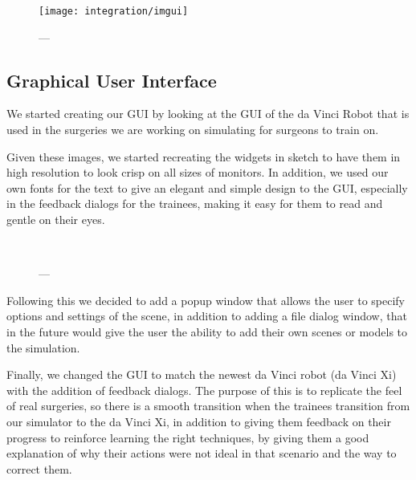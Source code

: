 \begin{figure}
  \centering%
  \texttt{[image: integration/imgui]}
  \caption{---}\label{fig:}
\end{figure}

\subsection{Graphical User Interface}\label{ssec:gui}
We started creating our GUI by looking at the GUI of the da Vinci Robot that is used in the surgeries we are working on simulating for surgeons to train on.

Given these images, we started recreating the widgets in sketch to have them in high resolution to look crisp on all sizes of monitors. In addition, we used our own fonts for the text to give an elegant and simple design to the GUI, especially in the feedback dialogs for the trainees, making it easy for them to read and gentle on their eyes.

\begin{figure}
  \centering%
  \setlength{\fboxsep}{0pt}%
  \setlength{\fboxrule}{0.1pt}%
  \\[1ex]
  \caption{---}\label{fig:}
\end{figure}

Following this we decided to add a popup window that allows the user to specify options and settings of the scene, in addition to adding a file dialog window, that in the future would give the user the ability to add their own scenes or models to the simulation.

\begin{figure}
\centering%
\setlength{\fboxsep}{0pt}%
\setlength{\fboxrule}{0.1pt}%
\end{figure}

Finally, we changed the GUI to match the newest da Vinci robot (da Vinci Xi) with the addition of feedback dialogs. The purpose of this is to replicate the feel of real surgeries, so there is a smooth transition when the trainees transition from our simulator to the da Vinci Xi, in addition to giving them feedback on their progress to reinforce learning the right techniques, by giving them a good explanation of why their actions were not ideal in that scenario and the way to correct them.

